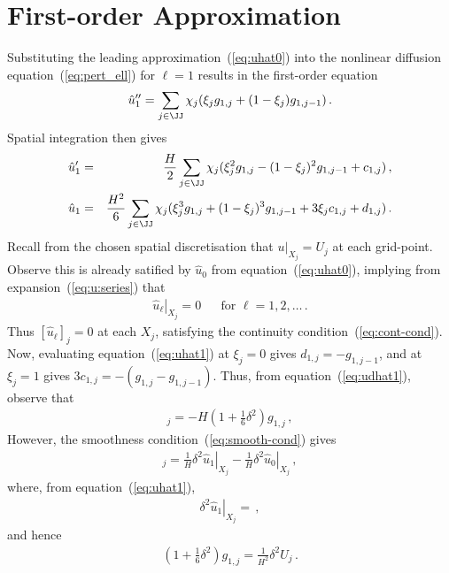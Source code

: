 \documentclass[12pt,a5paper]{article}
\begin{document}
\section{First-order Approximation}
Substituting the leading approximation~(\ref{eq:uhat0}) into the
nonlinear diffusion equation~(\ref{eq:pert_ell}) for $\ell=1$ results in
the first-order equation
\begin{eqnarray}
\hat{u}''_1 = \sum_{j\in\JJ}\chi_j(\xi_j g_{1,j}+(1-\xi_j)g_{1,j-1})\,.
\end{eqnarray}
Spatial integration then gives
\begin{eqnarray}
\hat{u}'_1 & = & \frac{H}{2}\sum_{j\in\JJ}\chi_j(\xi^2_j g_{1,j}
-(1-\xi_j)^2g_{1,j-1}+c_{1,j})\,,
\label{eq:udhat1}
\\
\hat{u}_1 & = & \frac{H^2}{6}\sum_{j\in\JJ}\chi_j(\xi^3_j g_{1,j}
+(1-\xi_j)^3g_{1,j-1}+3\xi_{j}c_{1,j}+d_{1,j})\,.
\label{eq:uhat1}
\end{eqnarray}
Recall from the chosen  spatial discretisation that $u|_{X_j}=U_{j}$ at each grid-point.
Observe this is already satified by $\hat{u}_0$ from equation~(\ref{eq:uhat0}), implying
from expansion~(\ref{eq:u:series}) that
\begin{eqnarray}
\left.\hat{u}_\ell\right|_{X_j}=0 && \mbox{for }\ell=1,2,\ldots\,.
\end{eqnarray}
Thus $[\hat{u}_\ell]_j=0$ at each $X_j$, satisfying the continuity 
condition~(\ref{eq:cont-cond}).
Now, evaluating equation~(\ref{eq:uhat1}) at $\xi_j=0$ gives $d_{1,j}=-g_{1,j-1}$,
and at $\xi_j=1$ gives $3c_{1,j}=-(g_{1,j}-g_{1,j-1})$.
Thus,  from equation~(\ref{eq:udhat1}), observe that
\begin{eqnarray}
[\hat{u}'_1]_j = -H(1+\frac{1}{6}\delta^2)g_{1,j}\,,
\end{eqnarray}
However, the smoothness 
condition~(\ref{eq:smooth-cond}) gives
\begin{eqnarray}
   [\hat{u}'_1]_j = 
\frac{1}{H}\left.\delta^{2}\hat{u}_1\right|_{X_j}
-\frac{1}{H}\left.\delta^{2}\hat{u}_0\right|_{X_j}\,,
\end{eqnarray}
where, from equation~(\ref{eq:uhat1}),
\begin{eqnarray}
\left.\delta^2\hat{u}_1\right|_{X_j} =
\,,
\end{eqnarray}
and hence
\begin{eqnarray}
(1+\frac{1}{6}\delta^2)g_{1,j} = \frac{1}{H^2}\delta^2U_j\,.
\end{eqnarray}

\end{document}
